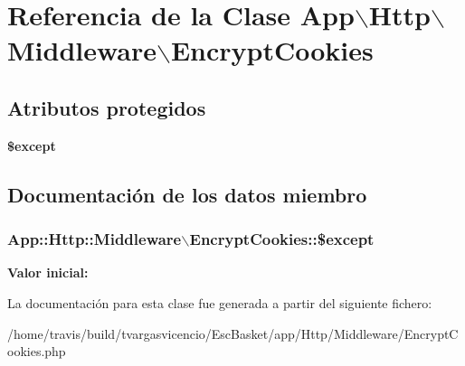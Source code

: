 \hypertarget{class_app_1_1_http_1_1_middleware_1_1_encrypt_cookies}{\section{\-Referencia de la \-Clase \-App$\backslash$\-Http$\backslash$\-Middleware$\backslash$\-Encrypt\-Cookies}
\label{class_app_1_1_http_1_1_middleware_1_1_encrypt_cookies}
}
\subsection*{\-Atributos protegidos}
\begin{DoxyCompactItemize}
\item 
{\bfseries \$except}
\end{DoxyCompactItemize}


\subsection{\-Documentación de los datos miembro}
\hypertarget{class_app_1_1_http_1_1_middleware_1_1_encrypt_cookies_a6b6a71f12f8e50ab44683f27854f23ac}{
\subsubsection[{\$except}]{\setlength{\rightskip}{0pt plus 5cm}\-App\-::\-Http\-::\-Middleware$\backslash$\-Encrypt\-Cookies\-::\$except}}\label{class_app_1_1_http_1_1_middleware_1_1_encrypt_cookies_a6b6a71f12f8e50ab44683f27854f23ac}
{\bfseries \-Valor inicial\-:}
\begin{DoxyCode}
 [
        
    ]
\end{DoxyCode}


\-La documentación para esta clase fue generada a partir del siguiente fichero\-:\begin{DoxyCompactItemize}
\item 
/home/travis/build/tvargasvicencio/\-Esc\-Basket/app/\-Http/\-Middleware/\-Encrypt\-Cookies.\-php\end{DoxyCompactItemize}
